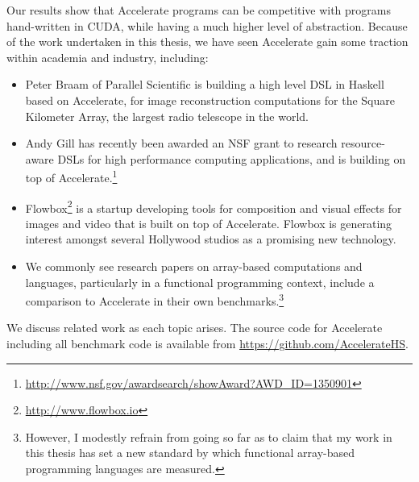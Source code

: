 Our results show that Accelerate programs can be competitive with programs
hand-written in CUDA, while having a much higher level of abstraction. Because
of the work undertaken in this thesis, we have seen Accelerate gain some
traction within academia and industry, including:

\begin{itemize}
    \item Peter Braam of Parallel Scientific is building a high level DSL in
        Haskell based on Accelerate, for image reconstruction computations for
        the Square Kilometer Array, the largest radio telescope in the world.

    \item Andy Gill has recently been awarded an NSF grant to research
        resource-aware DSLs for high performance computing applications, and is
        building on top of Accelerate.\footnote{\url{http://www.nsf.gov/awardsearch/showAward?AWD_ID=1350901}}

    \item Flowbox\footnote{\url{http://www.flowbox.io}} is a startup developing
        tools for composition and visual effects for images and video that is
        built on top of Accelerate. Flowbox is generating interest amongst
        several Hollywood studios as a promising new technology.


    \item We commonly see research papers on array-based computations and
        languages, particularly in a functional programming context, include a
        comparison to Accelerate in their own benchmarks.\footnote{However, I
        modestly refrain from going so far as to claim that my work in this
        thesis has set a new standard by which functional array-based
        programming languages are measured.}

\end{itemize}

We discuss related work as each topic arises. The source code for Accelerate
including all benchmark code is available from
\url{https://github.com/AccelerateHS}.



